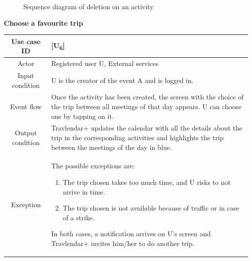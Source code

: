\documentclass[12pt,titlepage]{article}
\begin{document}
\begin{figure}
\centering
{} 
\caption{Sequence diagram of deletion on an activity}
\end{figure}
\clearpage
\newpage


\begin{flushleft}
\textbf{Choose a favourite trip}
\end{flushleft}

\begin{tabular}{cp{10cm}} 
Use case ID& {[U\textsubscript{6}]}\\ \hline
Actor&Registered user U, External services \\ \hline 

Input condition&U is the creator of the event A and is logged in.\\ \hline
Event flow&Once the activity has been created, the screen with the choice of the trip between all meetings of that day appears. U can choose one by tapping on it. \\ \hline
Output condition& Travlendar+ updates the calendar with all the details about the trip in the corresponding activities and highlights the trip between the meetings of the day in blue. 
\\ \hline
Exception& The possible exceptions are:
\begin{enumerate}
\item The trip chosen takes too much time, and U risks to not arrive in time. 
\item The trip chosen is not available because of traffic or in case of a strike. 
\end{enumerate} 
In both cases, a notification arrives on U's screen and Travlendar+ invites him/her to do another trip. \\ \hline 

\end{tabular}
\end{document}
